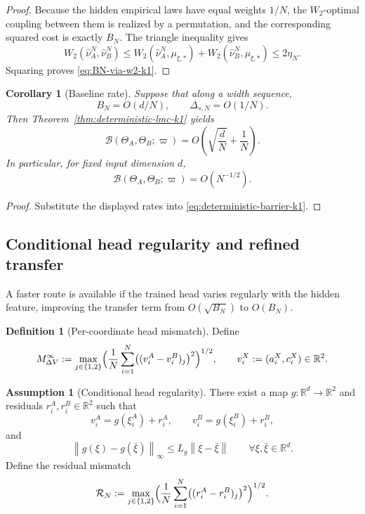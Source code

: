 \documentclass[11pt]{article}
\newtheorem{corollary}[theorem]{Corollary}
\theoremstyle{definition}
\newtheorem{definition}[theorem]{Definition}
\newtheorem{assumption}[theorem]{Assumption}
\newcommand{\R}{\mathbb{R}}
\newcommand{\norm}[1]{\left\lVert #1 \right\rVert}
\newcommand{\mc}[1]{\mathcal{#1}}
\newcommand{\cB}{\mathcal{B}}
\begin{document}
\begin{proof}
Because the hidden empirical laws have equal weights $1/N$, the $W_2$-optimal
coupling between them is realized by a permutation, and the corresponding
squared cost is exactly $B_N$. The triangle inequality gives
\[
  W_2(\hat\nu_A^N,\hat\nu_B^N)
  \le
  W_2(\hat\nu_A^N,\mu_{\xi,\ast}) + W_2(\hat\nu_B^N,\mu_{\xi,\ast})
  \le
  2\eta_N.
\]
Squaring proves \eqref{eq:BN-via-w2-k1}.
\end{proof}

\begin{corollary}[Baseline rate]
\label{cor:baseline-rate-k1}
Suppose that along a width sequence,
\[
  B_N=O(d/N),
  \qquad
  \Delta_{s,N}=O(1/N).
\]
Then Theorem~\ref{thm:deterministic-lmc-k1} yields
\[
  \cB(\Theta_A,\Theta_B;\varpi)
  =
  O\!\left(\sqrt{\frac{d}{N}}+\frac1N\right).
\]
In particular, for fixed input dimension $d$,
\[
  \cB(\Theta_A,\Theta_B;\varpi)=O(N^{-1/2}).
\]
\end{corollary}

\begin{proof}
Substitute the displayed rates into \eqref{eq:deterministic-barrier-k1}.
\end{proof}

\subsection{Conditional head regularity and refined transfer}

A faster route is available if the trained head varies regularly with the
hidden feature, improving the transfer term from $O(\sqrt{B_N})$ to $O(B_N)$.

\begin{definition}[Per-coordinate head mismatch]
\label{def:head-mismatch-k1}
Define
\[
  M_{\Delta V}^\infty
  :=
  \max_{j\in\{1,2\}}
  \Bigl(
    \frac1N\sum_{i=1}^N \bigl((v_i^A-v_i^B)_j\bigr)^2
  \Bigr)^{1/2},
  \qquad
  v_i^X:=(a_i^X,c_i^X)\in\R^2.
\]
\end{definition}

\begin{assumption}[Conditional head regularity]
\label{ass:head-regularity-k1}
There exist a map $g:\R^d\to\R^2$ and residuals $r_i^A,r_i^B\in\R^2$ such that
\[
  v_i^A=g(\xi_i^A)+r_i^A,
  \qquad
  v_i^B=g(\xi_i^B)+r_i^B,
\]
and
\[
  \norm{g(\xi)-g(\bar\xi)}_\infty
  \le
  L_g\norm{\xi-\bar\xi}
  \qquad
  \forall \xi,\bar\xi\in\R^d.
\]
Define the residual mismatch
\[
  \mc{R}_N
  :=
  \max_{j\in\{1,2\}}
  \Bigl(
    \frac1N\sum_{i=1}^N \bigl((r_i^A-r_i^B)_j\bigr)^2
  \Bigr)^{1/2}.
\]
\end{assumption}
\end{document}

